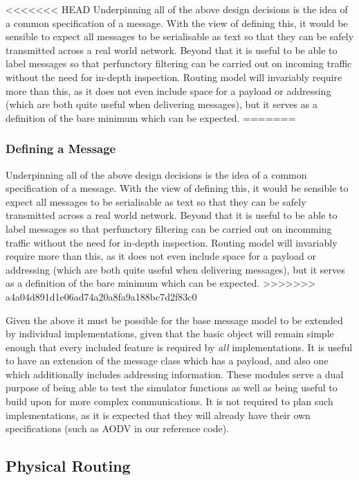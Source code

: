 <<<<<<< HEAD
Underpinning all of the above design decisions is the idea of a common specification of a message. With the view of defining this, it would be sensible to expect all messages to be serialisable as text so that they can be safely transmitted across a real world network. Beyond that it is useful to be able to label messages so that perfunctory filtering can be carried out on incoming traffic without the need for in-depth inspection. Routing model will invariably require more than this, as it does not even include space for a payload or addressing (which are both quite useful when delivering messages), but it serves as a definition of the bare minimum which can be expected. 
=======
\subsubsection{Defining a Message}
Underpinning all of the above design decisions is the idea of a common specification of a message. With the view of defining this, it would be sensible to expect all messages to be serialisable as text so that they can be safely transmitted across a real world network. Beyond that it is useful to be able to label messages so that perfunctory filtering can be carried out on incomming traffic without the need for in-depth inspection. Routing model will invariably require more than this, as it does not even include space for a payload or addressing (which are both quite useful when delivering messages), but it serves as a definition of the bare minimum which can be expected. 
>>>>>>> a4a04d891d1e06ad74a20a8fa9a188bc7d2f83c0

Given the above it must be possible for the base message model to be extended by individual implementations, given that the basic object will remain simple enough that every included feature is required by \textit{all} implementations. It is useful to have an extension of the message class which has a payload, and also one which additionally includes addressing information. These modules serve a dual purpose of being able to test the simulator functions as well as being useful to build upon for more complex communications. It is not required to plan such implementations, as it is expected that they will already have their own specifications (such as AODV in our reference code).
		
\subsection{Physical Routing} 

